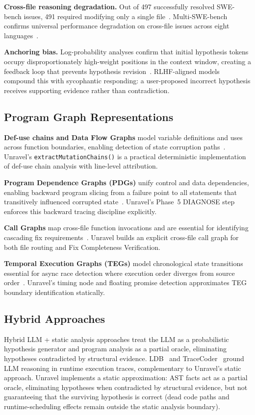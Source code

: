 \documentclass[12pt,a4paper]{article}
\newcommand{\code}[1]{\texttt{\small #1}}
\begin{document}
\textbf{Cross-file reasoning degradation.} Out of 497 successfully resolved SWE-bench
issues, 491 required modifying only a single file~\cite{swebench2509}.
Multi-SWE-bench confirms universal performance degradation on cross-file issues across eight
languages~\cite{multiswebench2025}.

\textbf{Anchoring bias.} Log-probability analyses confirm that initial hypothesis tokens
occupy disproportionately high-weight positions in the context window, creating a feedback
loop that prevents hypothesis revision~\cite{zhang2026}. RLHF-aligned models compound this
with sycophantic responding: a user-proposed incorrect hypothesis receives supporting
evidence rather than contradiction.

\subsection{Program Graph Representations}

\textbf{Def-use chains and Data Flow Graphs} model variable definitions and uses across
function boundaries, enabling detection of state corruption paths~\cite{aho2006,
horwitz1992}. Unravel's \code{extractMutationChains()} is a practical deterministic
implementation of def-use chain analysis with line-level attribution.

\textbf{Program Dependence Graphs (PDGs)} unify control and data dependencies, enabling
backward program slicing from a failure point to all statements that transitively influenced
corrupted state~\cite{ferrante1987}. Unravel's Phase~5 DIAGNOSE step enforces this backward
tracing discipline explicitly.

\textbf{Call Graphs} map cross-file function invocations and are essential for identifying
cascading fix requirements~\cite{cai2023}. Unravel builds an explicit cross-file call graph
for both file routing and Fix Completeness Verification.

\textbf{Temporal Execution Graphs (TEGs)} model chronological state transitions essential
for async race detection where execution order diverges from source order~\cite{ir2024,
o2lab}. Unravel's timing node and floating promise detection approximates TEG boundary
identification statically.

\subsection{Hybrid Approaches}

Hybrid LLM + static analysis approaches treat the LLM as a probabilistic hypothesis
generator and program analysis as a partial oracle, eliminating hypotheses contradicted by
structural evidence. LDB~\cite{ldb2024} and TraceCoder~\cite{tracecoder2026} ground LLM
reasoning in runtime execution traces, complementary to Unravel's static approach. Unravel
implements a static approximation: AST facts act as a partial oracle, eliminating hypotheses
when contradicted by structural evidence, but not guaranteeing that the surviving hypothesis
is correct (dead code paths and runtime-scheduling effects remain outside the static analysis
boundary).
\end{document}
